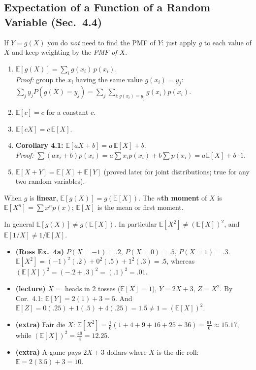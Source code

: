 \documentclass[11pt]{article}
\let\oldsubsection\subsection
\renewcommand{\subsection}{\Needspace{14\baselineskip}\oldsubsection}
\newcommand{\E}{\mathbb{E}}
\begin{document}
\subsection{Expectation of a Function of a Random Variable (Sec.\ 4.4)}

\begin{ideabox}
If $Y=g(X)$ you do \emph{not} need to find the PMF of $Y$: just apply $g$ to each value of $X$ and keep weighting by the \emph{PMF of $X$}.
\end{ideabox}

\begin{thmbox}
\begin{enumerate}
\item $\displaystyle\E[g(X)]=\sum_ig(x_i)\,p(x_i)$.\\
\emph{Proof:} group the $x_i$ having the same value $g(x_i)=y_j$: $\sum_j y_jP(g(X)=y_j)=\sum_j\sum_{i:g(x_i)=y_j}g(x_i)p(x_i)$.
\item $\E[c]=c$ for a constant $c$.
\item $\E[cX]=c\,\E[X]$.
\item \textbf{Corollary 4.1:} $\E[aX+b]=a\,\E[X]+b$.\\
\emph{Proof:} $\sum(ax_i+b)p(x_i)=a\sum x_ip(x_i)+b\sum p(x_i)=a\E[X]+b\cdot1$.
\item $\E[X+Y]=\E[X]+\E[Y]$ (proved later for joint distributions; true for any two random variables).
\end{enumerate}
When $g$ is \textbf{linear}, $\E[g(X)]=g(\E[X])$. The \textbf{$n$th moment} of $X$ is $\E[X^n]=\sum x^np(x)$; $\E[X]$ is the mean or first moment.
\end{thmbox}

\begin{warnbox}
In general $\E[g(X)]\ne g(\E[X])$. In particular $\E[X^2]\ne(\E[X])^2$, and $\E[1/X]\ne1/\E[X]$.
\end{warnbox}

\begin{exbox}[Examples]
\begin{itemize}
\item \textbf{(Ross Ex.\ 4a)} $P(X=-1)=.2$, $P(X=0)=.5$, $P(X=1)=.3$. $\E[X^2]=(-1)^2(.2)+0^2(.5)+1^2(.3)=.5$, whereas $(\E[X])^2=(-.2+.3)^2=(.1)^2=.01$.
\item \textbf{(lecture)} $X=$ heads in 2 tosses ($\E[X]=1$), $Y=2X+3$, $Z=X^2$. By Cor.\ 4.1: $\E[Y]=2(1)+3=5$. And $\E[Z]=0(.25)+1(.5)+4(.25)=1.5\ne1=(\E[X])^2$.
\item \textbf{(extra)} Fair die $X$: $\E[X^2]=\tfrac16(1+4+9+16+25+36)=\tfrac{91}6\approx15.17$, while $(\E[X])^2=\tfrac{49}4=12.25$.
\item \textbf{(extra)} A game pays $2X+3$ dollars where $X$ is the die roll: $\E=2(3.5)+3=10$.
\end{itemize}
\end{exbox}
\end{document}
